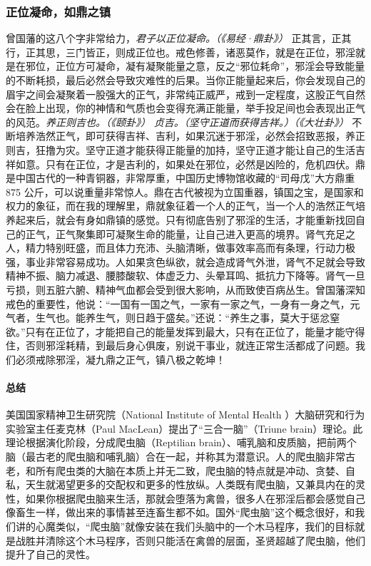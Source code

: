 \subsubsection{正位凝命，如鼎之镇}

曾国藩的这八个字非常给力，\textit{君子以正位凝命。（《易经·鼎卦》）} 正其言，正其行，正其思，三门皆正，则成正位也。戒色修善，诸恶莫作，就是在正位，邪淫就是在邪位，正位方可凝命，凝有凝聚能量之意，反之“邪位耗命”，邪淫会导致能量的不断耗损，最后必然会导致灾难性的后果。当你正能量起来后，你会发现自己的眉宇之间会凝聚着一股强大的正气，非常纯正威严，戒到一定程度，这股正气自然会在脸上出现，你的神情和气质也会变得充满正能量，举手投足间也会表现出正气的风范。\textit{养正则吉也。（《颐卦》）} \textit{贞吉。（坚守正道而获得吉祥。）（《大壮卦》）} 不断培养浩然正气，即可获得吉祥、吉利，如果沉迷于邪淫，必然会招致恶报，养正则吉，狂撸为灾。坚守正道才能获得正能量的加持，坚守正道才能让自己的生活吉祥如意。只有在正位，才是吉利的，如果处在邪位，必然是凶险的，危机四伏。鼎是中国古代的一种青铜器，非常厚重，中国历史博物馆收藏的“司母戊”大方鼎重 875 公斤，可以说重量非常惊人。鼎在古代被视为立国重器，镇国之宝，是国家和权力的象征，而在我的理解里，鼎就象征着一个人的正气，当一个人的浩然正气培养起来后，就会有身如鼎镇的感觉。只有彻底告别了邪淫的生活，才能重新找回自己的正气，正气聚集即可凝聚生命的能量，让自己进入更高的境界。肾气充足之人，精力特别旺盛，而且体力充沛、头脑清晰，做事效率高而有条理，行动力极强，事业非常容易成功。人如果贪色纵欲，就会造成肾气外泄，肾气不足就会导致精神不振、脑力减退、腰膝酸软、体虚乏力、头晕耳鸣、抵抗力下降等。肾气一旦亏损，则五脏六腑、精神气血都会受到很大影响，从而致使百病丛生。曾国藩深知戒色的重要性，他说：“一国有一国之气，一家有一家之气，一身有一身之气，元气者，生气也。能养生气，则日趋于盛矣。”还说：“养生之事，莫大于惩忿窒欲。”只有在正位了，才能把自己的能量发挥到最大，只有在正位了，能量才能守得住，否则邪淫耗精，到最后身心俱废，别说干事业，就连正常生活都成了问题。我们必须戒除邪淫，凝九鼎之正气，镇八极之乾坤！

\paragraph*{总结}

美国国家精神卫生研究院（National Institute of Mental Health ）大脑研究和行为实验室主任麦克林（Paul MacLean）提出了“三合一脑”（Triune brain）理论。此理论根据演化阶段，分成爬虫脑（Reptilian brain）、哺乳脑和皮质脑，把前两个脑（最古老的爬虫脑和哺乳脑）合在一起，并称其为潜意识。人的爬虫脑非常古老，和所有爬虫类的大脑在本质上并无二致，爬虫脑的特点就是冲动、贪婪、自私，天生就渴望更多的交配权和更多的性放纵。人类既有爬虫脑，又兼具内在的灵性，如果你根据爬虫脑来生活，那就会堕落为禽兽，很多人在邪淫后都会感觉自己像畜生一样，做出来的事情甚至连畜生都不如。国外“爬虫脑”这个概念很好，和我们讲的心魔类似，“爬虫脑”就像安装在我们头脑中的一个木马程序，我们的目标就是战胜并清除这个木马程序，否则只能活在禽兽的层面，圣贤超越了爬虫脑，他们提升了自己的灵性。

